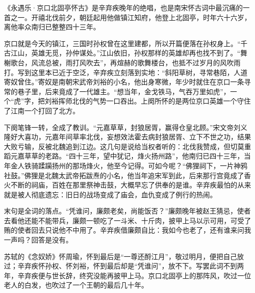\begin{appreciation}
《永遇乐·京口北固亭怀古》是辛弃疾晚年的绝唱，也是南宋怀古词中最沉痛的一首之一。开禧北伐前夕，朝廷起用他做镇江知府，他登上北固亭，时年六十六岁，离他率众南归已整整四十三年。

京口就是今天的镇江，三国时孙权曾在这里建都，所以开篇便落在孙权身上。“千古江山，英雄无觅，孙仲谋处。”江山依旧，孙权那样的英雄却再也找不到了。“舞榭歌台，风流总被，雨打风吹去”，再煊赫的歌舞楼台，也抵不过岁月的风吹雨打。写到这里本已近于空泛，辛弃疾立刻落到实地：“斜阳草树，寻常巷陌，人道寄奴曾住。”寄奴是南朝宋武帝刘裕的小名，他出身寒微，年少时就住在京口一条寻常的巷子里，后来竟成了一代雄主。“想当年，金戈铁马，气吞万里如虎”，一个“虎”字，把刘裕挥师北伐的气势一口吞出。上阕所怀的是两位京口英雄一个守住了江南一个打回了北方。

下阕笔锋一转，全成了教训。“元嘉草草，封狼居胥，赢得仓皇北顾。”宋文帝刘义隆好大喜功，元嘉年间草率北伐，妄想效法霍去病封狼居胥、立下不世之功，结果大败亏输，反被北魏追到江边。这几句是说给当权者听的：北伐我赞成，但切莫重蹈元嘉草草的老路。“四十三年，望中犹记，烽火扬州路”，他南归已四十三年，当年金人铁骑蹂躏扬州的那场烽火，他至今记得。可如今呢？“佛狸祠下，一片神鸦社鼓。”佛狸是北魏太武帝拓跋焘的小名，他当年追宋军到此，后来那行宫竟成了香火不断的祠庙，百姓在那里祭神击鼓，大概早忘了供奉的是谁。辛弃疾最怕的从来就是被人彻底遗忘：旧日的战场变成了庙会，血仇变成了例行的热闹。

末句是全词的落点。“凭谁问，廉颇老矣，尚能饭否？”廉颇晚年被赵王猜忌，使者去看他还能不能带兵，廉颇一顿吃了一斗米、十斤肉，披甲上马以示可用，可受了贿的使者回去只说他不中用了。辛弃疾借廉颇自比：我如今也老了，还有谁来问我一声吗？回答是没有。

苏轼的《念奴娇》怀周瑜，怀到最后是“一尊还酹江月”，敬过明月，便把自己放过；辛弃疾怀孙权、怀刘裕，怀到最后却是“凭谁问”，放不下。写罢此词不到两年，辛弃疾便与世长辞，终究没能再披甲上马。京口北固亭上的那阵风，吹过一位老人的白发，也吹过了一个王朝的最后几十年。
\end{appreciation}
